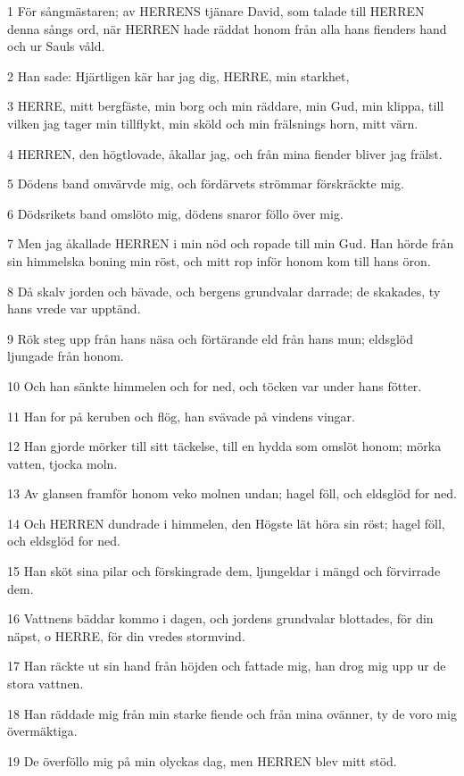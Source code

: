 \par 1 För sångmästaren; av HERRENS tjänare David, som talade till HERREN denna sångs ord, när HERREN hade räddat honom från alla hans fienders hand och ur Sauls våld.
\par 2 Han sade: Hjärtligen kär har jag dig, HERRE, min starkhet,
\par 3 HERRE, mitt bergfäste, min borg och min räddare, min Gud, min klippa, till vilken jag tager min tillflykt, min sköld och min frälsnings horn, mitt värn.
\par 4 HERREN, den högtlovade, åkallar jag, och från mina fiender bliver jag frälst.
\par 5 Dödens band omvärvde mig, och fördärvets strömmar förskräckte mig.
\par 6 Dödsrikets band omslöto mig, dödens snaror föllo över mig.
\par 7 Men jag åkallade HERREN i min nöd och ropade till min Gud. Han hörde från sin himmelska boning min röst, och mitt rop inför honom kom till hans öron.
\par 8 Då skalv jorden och bävade, och bergens grundvalar darrade; de skakades, ty hans vrede var upptänd.
\par 9 Rök steg upp från hans näsa och förtärande eld från hans mun; eldsglöd ljungade från honom.
\par 10 Och han sänkte himmelen och for ned, och töcken var under hans fötter.
\par 11 Han for på keruben och flög, han svävade på vindens vingar.
\par 12 Han gjorde mörker till sitt täckelse, till en hydda som omslöt honom; mörka vatten, tjocka moln.
\par 13 Av glansen framför honom veko molnen undan; hagel föll, och eldsglöd for ned.
\par 14 Och HERREN dundrade i himmelen, den Högste lät höra sin röst; hagel föll, och eldsglöd for ned.
\par 15 Han sköt sina pilar och förskingrade dem, ljungeldar i mängd och förvirrade dem.
\par 16 Vattnens bäddar kommo i dagen, och jordens grundvalar blottades, för din näpst, o HERRE, för din vredes stormvind.
\par 17 Han räckte ut sin hand från höjden och fattade mig, han drog mig upp ur de stora vattnen.
\par 18 Han räddade mig från min starke fiende och från mina ovänner, ty de voro mig övermäktiga.
\par 19 De överföllo mig på min olyckas dag, men HERREN blev mitt stöd.
